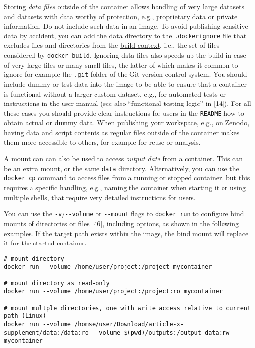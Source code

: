 \documentclass[10pt,letterpaper]{article}
\begin{document}
Storing \emph{data files} outside of the container allows handling of
very large datasets and datasets with data worthy of protection, e.g.,
proprietary data or private information. Do not include such data in an
image. To avoid publishing sensitive data by accident, you can add the
data directory to the
\href{https://docs.docker.com/engine/reference/commandline/build/\#use-a-dockerignore-file}{\texttt{.dockerignore}}
file that excludes files and directories from the
\href{https://docs.docker.com/engine/reference/commandline/build/\#extended-description}{build
context}, i.e., the set of files considered by \texttt{docker\ build}.
Ignoring data files also speeds up the build in case of very large files
or many small files, the latter of which makes it common to ignore for
example the \texttt{.git} folder of the Git version control system. You
should include dummy or test data into the image to be able to ensure
that a container is functional without a larger custom dataset, e.g.,
for automated tests or instructions in the user manual (see also
``functional testing logic'' in {[}14{]}). For all these cases you
should provide clear instructions for users in the \texttt{README} how
to obtain actual or dummy data. When publishing your workspace, e.g., on
Zenodo, having data and script contents as regular files outside of the
container makes them more accessible to others, for example for reuse or
analysis.

A mount can can also be used to access \emph{output data} from a
container. This can be an extra mount, or the same \texttt{data}
directory. Alternatively, you can use the
\href{https://docs.docker.com/engine/reference/commandline/cp/}{\texttt{docker\ cp}}
command to access files from a running or stopped container, but this
requires a specific handling, e.g., naming the container when starting
it or using multiple shells, that require very detailed instructions for
users.

You can use the \texttt{-v}/\texttt{-\/-volume} or \texttt{-\/-mount}
flags to \texttt{docker\ run} to configure bind mounts of directories or
files {[}46{]}, including options, as shown in the following examples.
If the target path exists within the image, the bind mount will replace
it for the started container.

\begin{verbatim}
# mount directory
docker run --volume /home/user/project:/project mycontainer

# mount directory as read-only
docker run --volume /home/user/project:/project:ro mycontainer

# mount multple directories, one with write access relative to current path (Linux)
docker run --volume /homse/user/Download/article-x-supplement/data:/data:ro --volume $(pwd)/outputs:/output-data:rw mycontainer
\end{verbatim}
\end{document}
